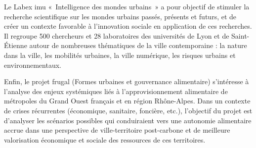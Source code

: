 Le Labex {\sc imu} « Intelligence des mondes urbains » a pour objectif de stimuler
la recherche scientifique
sur les mondes urbains passés, présents et futurs, et de créer un contexte favorable
à l'innovation sociale en application de ces recherches.
Il regroupe 500 chercheurs
et 28 laboratoires des universités de Lyon et de Saint-Étienne
autour de nombreuses thématiques de la ville contemporaine :
la nature dans la ville, les mobilités urbaines, la ville numérique,
les risques urbains et environnementaux.

Enfin, le projet {\sc frugal} (Formes urbaines et gouvernance alimentaire)
s'intéresse à  l’analyse   des   enjeux   systémiques   liés   à
l’approvisionnement alimentaire de métropoles du Grand Ouest français et en région Rhône-Alpes.
Dans un contexte de crises récurrentes (économique, sanitaire, foncière, etc.), 
l'objectif du projet est d'analyser les scénarios possibles qui conduiraient vers une 
autonomie alimentaire accrue dans une perspective de ville-territoire
post-carbone et de meilleure valorisation économique et sociale des ressources de ces
territoires.